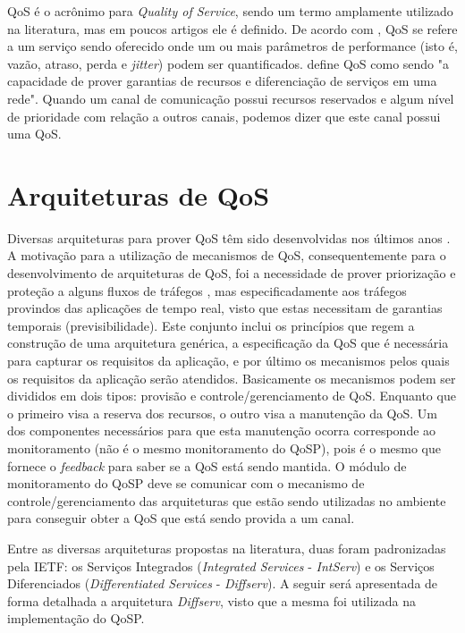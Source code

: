 \label{cap:qos}
\acresetall
	QoS é o acrônimo para \textit{Quality of Service}, sendo um termo amplamente utilizado na literatura, mas em poucos artigos ele é definido. De acordo com \cite{GODERIS01}, QoS se refere a um serviço sendo oferecido onde um ou mais parâmetros de performance (isto é, vazão, atraso, perda e \textit{jitter}) podem ser quantificados. \cite{WANG01} define QoS como sendo "a capacidade de prover garantias de recursos e diferenciação de serviços em uma rede". Quando um canal de comunicação possui recursos reservados e algum nível de prioridade com relação a outros canais, podemos dizer que este canal possui uma QoS.	
	
\section{Arquiteturas de QoS}

	Diversas arquiteturas para prover QoS têm sido desenvolvidas nos últimos anos \cite{ACH96}. A motivação para a utilização de mecanismos de QoS, consequentemente para o desenvolvimento de arquiteturas de QoS, foi a necessidade de prover priorização e proteção a alguns fluxos de tráfegos \cite{GEBOSHIN03}, mas especificadamente aos tráfegos provindos das aplicações de tempo real, visto que estas necessitam de garantias temporais (previsibilidade). Este conjunto inclui os princípios que regem a construção de uma arquitetura genérica, a especificação da QoS que é necessária para capturar os requisitos da aplicação, e por último os mecanismos pelos quais os requisitos da aplicação serão atendidos. Basicamente os mecanismos podem ser divididos em dois tipos: provisão e controle/gerenciamento de QoS. Enquanto que o primeiro visa a reserva dos recursos, o outro visa a manutenção da QoS. Um dos componentes necessários para que esta manutenção ocorra corresponde ao monitoramento (não é o mesmo monitoramento do QoSP), pois é o mesmo que fornece o \textit{feedback} para saber se a QoS está sendo mantida. O módulo de monitoramento do QoSP deve se comunicar com o mecanismo de controle/gerenciamento das arquiteturas que estão sendo utilizadas no ambiente para conseguir obter a QoS que está sendo provida a um canal.
	
	Entre as diversas arquiteturas propostas na literatura, duas foram padronizadas pela IETF: os Serviços Integrados (\textit{Integrated Services} - \textit{IntServ}) e os Serviços Diferenciados (\textit{Differentiated Services} - \textit{Diffserv}). A seguir será apresentada de forma detalhada a arquitetura \textit{Diffserv}, visto que a mesma foi utilizada na implementação do QoSP.
	
